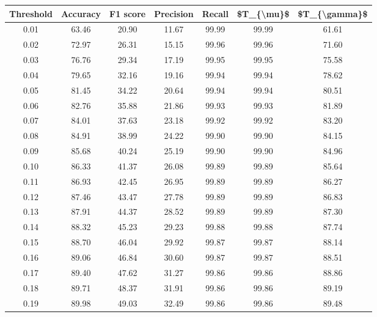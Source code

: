 \begin{tabular}{|c|c|c|c|c|c|c|}
\toprule
 Threshold &  Accuracy &  F1 score &  Precision &  Recall &  \$T\_\{\textbackslash mu\}\$ &  \$T\_\{\textbackslash gamma\}\$ \\
\hline
      0.01 &     63.46 &     20.90 &      11.67 &   99.99 &      99.99 &         61.61 \\
      0.02 &     72.97 &     26.31 &      15.15 &   99.96 &      99.96 &         71.60 \\
      0.03 &     76.76 &     29.34 &      17.19 &   99.95 &      99.95 &         75.58 \\
      0.04 &     79.65 &     32.16 &      19.16 &   99.94 &      99.94 &         78.62 \\
      0.05 &     81.45 &     34.22 &      20.64 &   99.94 &      99.94 &         80.51 \\
      0.06 &     82.76 &     35.88 &      21.86 &   99.93 &      99.93 &         81.89 \\
      0.07 &     84.01 &     37.63 &      23.18 &   99.92 &      99.92 &         83.20 \\
      0.08 &     84.91 &     38.99 &      24.22 &   99.90 &      99.90 &         84.15 \\
      0.09 &     85.68 &     40.24 &      25.19 &   99.90 &      99.90 &         84.96 \\
      0.10 &     86.33 &     41.37 &      26.08 &   99.89 &      99.89 &         85.64 \\
      0.11 &     86.93 &     42.45 &      26.95 &   99.89 &      99.89 &         86.27 \\
      0.12 &     87.46 &     43.47 &      27.78 &   99.89 &      99.89 &         86.83 \\
      0.13 &     87.91 &     44.37 &      28.52 &   99.89 &      99.89 &         87.30 \\
      0.14 &     88.32 &     45.23 &      29.23 &   99.88 &      99.88 &         87.74 \\
      0.15 &     88.70 &     46.04 &      29.92 &   99.87 &      99.87 &         88.14 \\
      0.16 &     89.06 &     46.84 &      30.60 &   99.87 &      99.87 &         88.51 \\
      0.17 &     89.40 &     47.62 &      31.27 &   99.86 &      99.86 &         88.86 \\
      0.18 &     89.71 &     48.37 &      31.91 &   99.86 &      99.86 &         89.19 \\
      0.19 &     89.98 &     49.03 &      32.49 &   99.86 &      99.86 &         89.48 \\

\end{tabular}
